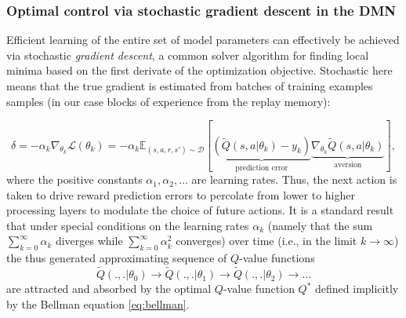 \documentclass[10pt,letterpaper]{article}
\begin{document}
\subsubsection{Optimal control via stochastic gradient descent in the DMN}
Efficient learning of the entire set of model parameters can effectively be achieved
via stochastic \textit{gradient descent}, a common solver algorithm for finding
local minima based on the first derivate of the optimization objective.
Stochastic here means that the true gradient is estimated from batches of training examples samples (in our case blocks of experience from the replay memory):


\begin{equation}
  \delta= -\alpha_k \nabla_{\theta_{k}}\mathcal L(\theta_{k})
  = -\alpha_k\mathbb E_{(s, a, r, s') \sim \mathcal D}[\underbrace{(\tilde{Q}(s, a|\theta_{k}) - y_k)}_{\text{prediction error}}
    \underbrace{\nabla_{\theta_{k}}\tilde{Q}(s, a|\theta_{k})}_{\text{aversion}}],
  \label{eq:oracle}
\end{equation}
where the positive constants $\alpha_1, \alpha_2,\ldots$ are learning rates.
Thus, the next action is taken to drive reward prediction errors
to percolate from lower to higher processing layers to modulate the
choice of future actions. It is a standard result that under special conditions on the learning rates $\alpha_k$
(namely that the sum $\sum_{k=0}^\infty\alpha_k$ diverges while $\sum_{k=0}^\infty\alpha_k^2$ converges) over time (i.e., in the limit $k \rightarrow \infty$)
the thus generated approximating sequence of $Q$-value functions
$$\tilde{Q}(.,.|\theta_0) \rightarrow \tilde{Q}(.,.|\theta_1) \rightarrow \tilde{Q}(.,.|\theta_2) \rightarrow \ldots$$
are attracted and absorbed by the optimal $Q$-value function $Q^*$ defined implicitly by the Bellman equation \eqref{eq:bellman}.

\end{document}
